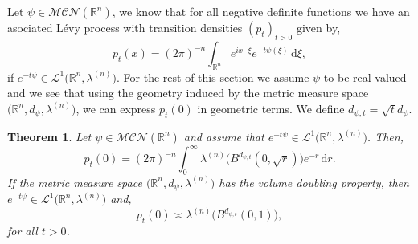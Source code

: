 \documentclass[a4paper, 12pt]{report}
\newtheorem{theorem}{Theorem}[section]
\theoremstyle{remark}
\theoremstyle{definition}
\begin{document}
Let $\psi \in \mathcal{MCN}(\mathbb{R}^n)$, we know that for all negative definite functions we have an asociated L\'evy process with transition densities $(p_t)_{t > 0}$ given by,
$$
p_t(x) = (2\pi)^{-n}\int_{\mathbb{R}^n}e^{ix\cdot\xi}e^{-t\psi(\xi)}\,\mathrm{d}\xi, 
$$
if $e^{-t\psi} \in \mathcal{L}^1\big(\mathbb{R}^n, \lambda^{(n)}\big)$.  For the rest of this section we assume $\psi$ to be real-valued and we see that using the geometry induced by the metric measure space $\big(\mathbb{R}^n, d_\psi, \lambda^{(n)}\big)$, we can express $p_t(0)$ in geometric terms.  We define $d_{\psi, t} = \sqrt{t}d_\psi$.
\begin{theorem}\label{FAaSGRtLPT1}
Let $\psi \in \mathcal{MCN}(\mathbb{R}^n)$ and assume that $e^{-t\psi} \in \mathcal{L}^1\big(\mathbb{R}^n, \lambda^{(n)}\big)$.  Then,
\begin{equation}
p_t(0) = (2\pi)^{-n}\int_0^\infty\lambda^{(n)}\big(B^{d_{\psi, t}}(0, \sqrt{r})\big)e^{-r}\,\mathrm{d}r.
\end{equation}
If the metric measure space $\big(\mathbb{R}^n, d_\psi, \lambda^{(n)}\big)$ has the volume doubling property, then $e^{-t\psi} \in \mathcal{L}^1\big(\mathbb{R}^n, \lambda^{(n)}\big)$ and,
\begin{equation}
p_t(0) \asymp \lambda^{(n)}\big(B^{d_{\psi, t}}(0, 1)\big),
\end{equation}
for all $t > 0$.
\end{theorem}
\end{document}
